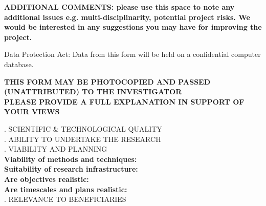 {\bf
ADDITIONAL COMMENTS:   please  use this space to note any additional
issues e.g. multi-disciplinarity, potential project risks. We would be
interested in any suggestions you may have for improving the project.}
%


\vfill %
{\sc Data
Protection Act: Data from this form will be held on a confidential
computer database.}
\newpage

{\normalsize\bf
THIS FORM MAY BE PHOTOCOPIED AND PASSED (UNATTRIBUTED) TO THE
INVESTIGATOR\\
\hspace*{2cm}PLEASE PROVIDE A FULL EXPLANATION IN SUPPORT OF YOUR VIEWS}

{.  SCIENTIFIC \& TECHNOLOGICAL QUALITY}\\


{.  ABILITY  TO UNDERTAKE  THE RESEARCH}\\

{.  VIABILITY  AND  PLANNING}\\

{\bf Viability of methods and techniques:}\\

{\bf Suitability of research infrastructure:}\\

{\bf Are objectives realistic:}\\

{\bf Are timescales and plans realistic:}\\

{.  RELEVANCE TO BENEFICIARIES}\\


